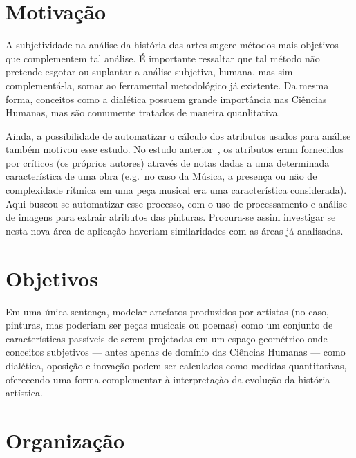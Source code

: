 \section{Motivação}

A subjetividade na análise da história das artes sugere métodos mais
objetivos que complementem tal análise. É importante ressaltar que tal
método não pretende esgotar ou suplantar a análise subjetiva, humana,
mas sim complementá-la, somar ao ferramental metodológico já
existente. Da mesma forma, conceitos como a dialética possuem grande
importância nas Ciências Humanas, mas são comumente tratados de
maneira quanlitativa.

Ainda, a possibilidade de automatizar o cálculo dos atributos usados
para análise também motivou esse estudo. No estudo
anterior~\cite{vieira}, os atributos eram fornecidos por críticos (os
próprios autores) através de notas dadas a uma determinada
característica de uma obra (e.g.\ no caso da Música, a presença ou não
de complexidade rítmica em uma peça musical era uma característica
considerada). Aqui buscou-se automatizar esse processo, com o uso de
processamento e análise de imagens para extrair atributos das
pinturas. Procura-se assim investigar se nesta nova área de aplicação
haveriam similaridades com as áreas já analisadas.

\section{Objetivos}

Em uma única sentença, modelar artefatos produzidos por artistas (no
caso, pinturas, mas poderiam ser peças musicais ou poemas) como um
conjunto de características passíveis de serem projetadas em um espaço
geométrico onde conceitos subjetivos --- antes apenas de domínio das
Ciências Humanas --- como dialética, oposição e inovação podem ser
calculados como medidas quantitativas, oferecendo uma forma
complementar à interpretaçào da evolução da história artística.

\section{Organização}

